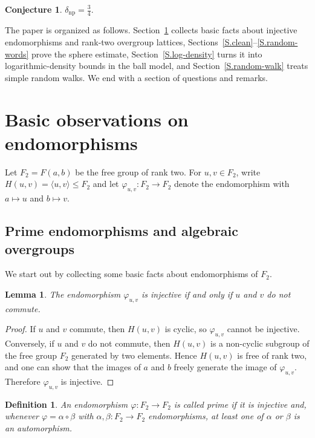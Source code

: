 \documentclass{amsproc}
\newtheorem{lemma}[theorem]{Lemma}
\newtheorem{definition}[theorem]{Definition}
\newtheorem*{conjecture}{Conjecture}
\begin{document}
\begin{conjecture}
$
        \delta_{\mathrm{np}}=\frac34.
$
\end{conjecture}

The paper is organized as follows. Section~\ref{S.basic} collects basic facts
about injective endomorphisms and rank-two overgroup lattices,
Sections~\ref{S.clean}--\ref{S.random-words} prove the sphere estimate,
Section~\ref{S.log-density} turns it into logarithmic-density bounds in the ball
model, and Section~\ref{S.random-walk} treats simple random walks. We end with a section of questions and remarks.

\section{Basic observations on endomorphisms}\label{S.basic}

Let $F_2=F(a,b)$ be the free group of rank two.  For $u,v\in F_2$, write
$H(u,v)=\langle u,v\rangle \leq F_2$ and let $\varphi_{u,v}\colon F_2\to F_2$ denote
the endomorphism with $a\mapsto u$ and $b\mapsto v$.

\subsection{Prime endomorphisms and algebraic overgroups}

We start out by collecting some basic facts about endomorphisms of $F_2$.

\begin{lemma}\label{L.injective.noncommuting}
The endomorphism $\varphi_{u,v}$ is injective if and only if $u$ and $v$ do not
commute.
\end{lemma}

\begin{proof}
If $u$ and $v$ commute, then $H(u,v)$ is cyclic, so $\varphi_{u,v}$ cannot be
injective.  Conversely, if $u$ and $v$ do not commute, then $H(u,v)$ is a
non-cyclic subgroup of the free group $F_2$ generated by two elements.  Hence
$H(u,v)$ is free of rank two, and one can show that the images of $a$ and $b$ freely generate the
image of $\varphi_{u,v}$.  Therefore $\varphi_{u,v}$ is injective.
\end{proof}

\begin{definition} \label{def:prime}
An endomorphism $\varphi\colon F_2\to F_2$ is called \emph{prime} if it is
injective and, whenever $\varphi=\alpha\circ\beta$ with
$\alpha,\beta\colon F_2\to F_2$  endomorphisms, at least one of
$\alpha$ or $\beta$ is an automorphism.
\end{definition}
\end{document}
